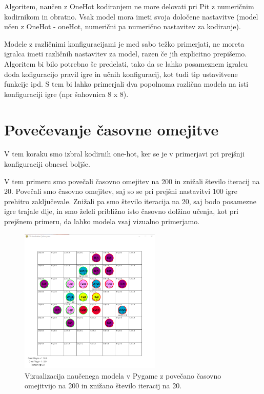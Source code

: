 \documentclass[a4paper, 12pt]{book}
\begin{document}
Algoritem, naučen z OneHot kodiranjem ne more delovati pri Pit z numeričnim kodirnikom in obratno. 
Vsak model mora imeti svoja določene nastavitve (model učen z OneHot - oneHot, numerični pa numerično nastavitev za kodiranje).

Modele z različnimi konfiguracijami je med sabo težko primerjati, ne moreta igralca imeti različnih nastavitev za model, razen če jih explicitno prepišemo.
Algoritem bi bilo potrebno še predelati, tako da se lahko posameznem igralcu doda kofiguracijo pravil igre in učnih konfiguracij, kot tudi tip ustavitvene funkcije ipd.
S tem bi lahko primerjali dva popolnoma različna modela na isti konfiguraciji igre (npr šahovnica 8 x 8).

\section{Povečevanje časovne omejitve}
\label{resultSecond}
V tem koraku smo izbral kodirnih one-hot, ker se je v primerjavi pri prejšnji konfiguraciji obnesel boljše.

V tem primeru smo povečali časovno omejitev na 200 in znižali število iteracij na 20.
Povečali smo časovno omejitev, saj so se pri prejšni nastavitvi 100 igre prehitro zaključevale.
Znižali pa smo število iteracija na 20, saj bodo posamezne igre trajale dlje, in smo želeli približno isto časovno dolžino učenja, kot pri prejšnem primeru, da lahko modela vsaj vizualno primerjamo.

\begin{figure}[h]
	\begin{center}
		\includegraphics[width=0.6\textwidth]{photos/second-2018-11-12.pdf}
	\end{center}
	\caption{Vizualizacija naučenega modela v Pygame z povečano časovno omejitvijo  na 200 in znižano število iteracij na 20.}
	\label{vizualizacijaRezultatov200timeout20Iters}
\end{figure}
\end{document}
